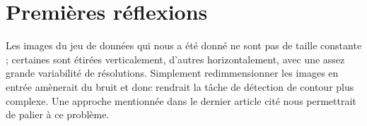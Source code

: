\documentclass{report}
\begin{document}
\section{Premières réflexions}

Les images du jeu de données qui nous a été donné ne sont pas de taille constante ;
certaines sont étirées verticalement, d'autres horizontalement, avec une assez
grande variabilité de résolutions. Simplement redimmensionner les images en entrée
amènerait du bruit et donc rendrait la tâche de détection de contour plus complexe.
Une approche mentionnée dans le dernier article cité nous permettrait de palier
à ce problème.
\end{document}
